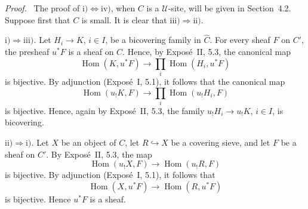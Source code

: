 \documentclass[11pt]{article}
\newcommand{\U}{\mathcal{U}}
\newcommand{\Hom}{\operatorname{Hom}}
\newenvironment{prooftext}{\par\noindent\emph{Proof.}\ }{\par\medskip}
\begin{document}
\begin{prooftext}
The proof of \(\mathrm{i)}\Leftrightarrow\mathrm{iv)}\), when \(C\) is a \(\U\)-site, will be given in Section~4.2. Suppose first that \(C\) is small. It is clear that \(\mathrm{iii)}\Rightarrow\mathrm{ii)}\).

\medskip\noindent
\emph{\(\mathrm{i)}\Rightarrow\mathrm{iii)}\).} Let \(H_i\to K\), \(i\in I\), be a bicovering family in \(\widehat C\). For every sheaf \(F\) on \(C'\), the presheaf \(u^*F\) is a sheaf on \(C\). Hence, by Expos\'e~II, 5.3, the canonical map
\[
\Hom(K,u^*F)\longrightarrow\prod_i\Hom(H_i,u^*F)
\]
is bijective. By adjunction (Expos\'e~I, 5.1), it follows that the canonical map
\[
\Hom(u_!K,F)\longrightarrow\prod_i\Hom(u_!H_i,F)
\]
is bijective. Hence, again by Expos\'e~II, 5.3, the family \(u_!H_i\to u_!K\), \(i\in I\), is bicovering.

\medskip\noindent
\emph{\(\mathrm{ii)}\Rightarrow\mathrm{i)}\).} Let \(X\) be an object of \(C\), let \(R\hookrightarrow X\) be a covering sieve, and let \(F\) be a sheaf on \(C'\). By Expos\'e~II, 5.3, the map
\[
\Hom(u_!X,F)\longrightarrow \Hom(u_!R,F)
\]
is bijective. By adjunction (Expos\'e~I, 5.1), it follows that
\[
\Hom(X,u^*F)\longrightarrow\Hom(R,u^*F)
\]
is bijective. Hence \(u^*F\) is a sheaf.


\end{prooftext}
\end{document}
